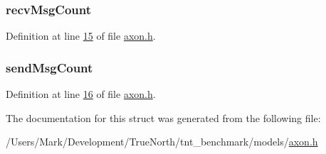 \hypertarget{structaxon_state_a7fc444364b1559859bccdf91f1e95475}{}
\subsubsection[{recv\+Msg\+Count}]{ recv\+Msg\+Count}\label{structaxon_state_a7fc444364b1559859bccdf91f1e95475}


Definition at line \hyperlink{axon_8h_source_l00015}{15} of file \hyperlink{axon_8h_source}{axon.\+h}.

\hypertarget{structaxon_state_a217ba44fb923dc4dc62bb73b14e61517}{}
\subsubsection[{send\+Msg\+Count}]{ send\+Msg\+Count}\label{structaxon_state_a217ba44fb923dc4dc62bb73b14e61517}


Definition at line \hyperlink{axon_8h_source_l00016}{16} of file \hyperlink{axon_8h_source}{axon.\+h}.



The documentation for this struct was generated from the following file\+:\begin{DoxyCompactItemize}
\item 
/\+Users/\+Mark/\+Development/\+True\+North/tnt\+\_\+benchmark/models/\hyperlink{axon_8h}{axon.\+h}\end{DoxyCompactItemize}
